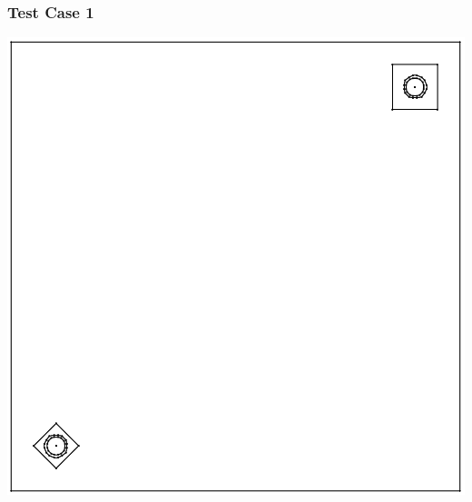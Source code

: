 \documentclass[]{beamer}
\begin{document}
\begin{frame}[t]\frametitle{Test Case 1}
\centering
\includegraphics[scale = 0.4]{figures/unbalanced_lattice-eps-converted-to.pdf}
\end{frame}
\end{document}

